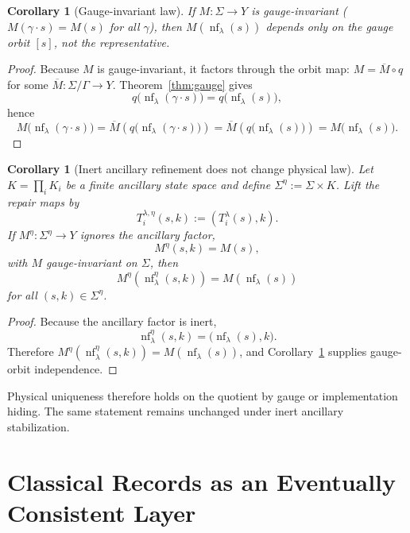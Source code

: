 \documentclass[11pt]{article}
\newtheorem{corollary}[theorem]{Corollary}
\theoremstyle{remark}
\theoremstyle{plain}
\begin{document}
\begin{corollary}[Gauge-invariant law]\label{cor:gaugeinv}
If $M:\Sigma\to Y$ is gauge-invariant ($M(\gamma\cdot s)=M(s)$ for all $\gamma$), then $M(\operatorname{nf}_\lambda(s))$ depends only on the gauge orbit $[s]$, not the representative.
\end{corollary}

\begin{proof}
Because $M$ is gauge-invariant, it factors through the orbit map: $M=\overline M\circ q$ for some
$\overline M:\Sigma/\Gamma\to Y$. Theorem~\ref{thm:gauge} gives
\[
q\bigl(\operatorname{nf}_\lambda(\gamma\cdot s)\bigr)
=
q\bigl(\operatorname{nf}_\lambda(s)\bigr),
\]
hence
\[
M\bigl(\operatorname{nf}_\lambda(\gamma\cdot s)\bigr)
=
\overline M\!\left(q\bigl(\operatorname{nf}_\lambda(\gamma\cdot s)\bigr)\right)
=
\overline M\!\left(q\bigl(\operatorname{nf}_\lambda(s)\bigr)\right)
=
M\bigl(\operatorname{nf}_\lambda(s)\bigr).
\]
\end{proof}

\begin{corollary}[Inert ancillary refinement does not change physical law]\label{cor:ancilla}
Let \(K=\prod_i K_i\) be a finite ancillary state space and define \(\Sigma^\eta:=\Sigma\times K\). Lift the repair maps by
\[
T_i^{\lambda,\eta}(s,k):=(T_i^\lambda(s),k).
\]
If \(M^\eta:\Sigma^\eta\to Y\) ignores the ancillary factor,
\[
M^\eta(s,k)=M(s),
\]
with \(M\) gauge-invariant on \(\Sigma\), then
\[
M^\eta(\operatorname{nf}_\lambda^\eta(s,k))
=
M(\operatorname{nf}_\lambda(s))
\]
for all \((s,k)\in\Sigma^\eta\).
\end{corollary}

\begin{proof}
Because the ancillary factor is inert,
\[
\operatorname{nf}_\lambda^\eta(s,k)=\bigl(\operatorname{nf}_\lambda(s),k\bigr).
\]
Therefore \(M^\eta(\operatorname{nf}_\lambda^\eta(s,k))=M(\operatorname{nf}_\lambda(s))\), and Corollary~\ref{cor:gaugeinv} supplies gauge-orbit independence.
\end{proof}

Physical uniqueness therefore holds on the quotient by gauge or implementation hiding. The same
statement remains unchanged under inert ancillary stabilization.


\section{Classical Records as an Eventually Consistent Layer}
\end{document}
